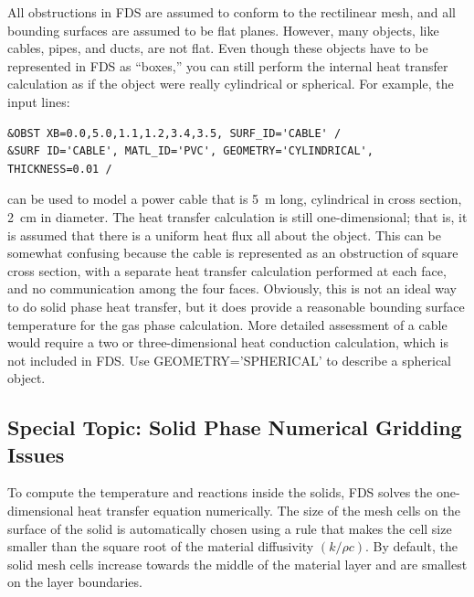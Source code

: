 \documentclass[11pt]{book}
\begin{document}
\label{info:GEOMETRY}

All obstructions in FDS are assumed to conform to the rectilinear
mesh, and all bounding surfaces are assumed to be flat
planes. However, many objects, like cables, pipes, and ducts, are not
flat. Even though these objects have to be represented in FDS as
``boxes,'' you can still perform the internal heat transfer
calculation as if the object were really cylindrical or spherical. For
example, the input lines:
\begin{lstlisting}
&OBST XB=0.0,5.0,1.1,1.2,3.4,3.5, SURF_ID='CABLE' /
&SURF ID='CABLE', MATL_ID='PVC', GEOMETRY='CYLINDRICAL', THICKNESS=0.01 /
\end{lstlisting}
can be used to model a power cable that is 5~m long, cylindrical in
cross section, 2~cm in diameter. The heat transfer calculation is
still one-dimensional; that is, it is assumed that there is a uniform
heat flux all about the object. This can be somewhat confusing because
the cable is represented as an obstruction of square cross section,
with a separate heat transfer calculation performed at each face, and
no communication among the four faces. Obviously, this is not an ideal
way to do solid phase heat transfer, but it does provide a reasonable
bounding surface temperature for the gas phase calculation. More
detailed assessment of a cable would require a two or
three-dimensional heat conduction calculation, which is not included
in FDS. Use {\ct GEOMETRY='SPHERICAL'} to describe a spherical object.


\subsection{Special Topic: Solid Phase Numerical Gridding Issues}
\label{info:solid_phase_stability}

To compute the temperature and reactions inside the solids, FDS solves
the one-dimensional heat transfer equation numerically. The size of
the mesh cells on the surface of the solid is automatically chosen
using a rule that makes the cell size smaller than the square root of
the material diffusivity $(k/\rho c)$. By default, the solid mesh
cells increase towards the middle of the material layer and are smallest
on the layer boundaries.
\end{document}
